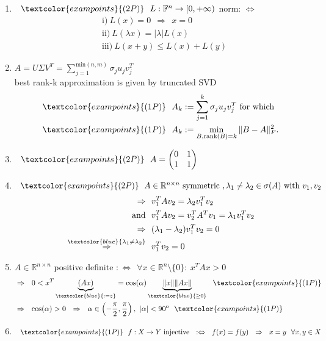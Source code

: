 {\color{solution}
\begin{enumerate}
	\item $~~\textcolor{exampoints}{(2P)}~~L:\mathbb{F}^n\rightarrow[0,+\infty)$ norm: $\Leftrightarrow$
	\begin{align*}
	&\text{i)}~L(x)=0~~\Rightarrow~~x=0\\
	&\text{ii)}~L(\lambda x)=|\lambda|L(x)\\
	&\text{iii)}~L(x+y)\leq L(x)+L(y)
	\end{align*}
	\item 
	$A=U\Sigma V^T=\sum_{j=1}^{\text{min}(n,m)}\sigma_ju_jv_j^T$\\
	best rank-k approximation is given by truncated SVD
	\begin{align*}
	&\textcolor{exampoints}{(1P)}~~A_k:=\sum_{j=1}^{k}\sigma_ju_jv_j^T~\text{for which}\\
	&\textcolor{exampoints}{(1P)}~~A_k:=\min_{B,\text{rank}(B)=k}\|B-A\|_F^2.
	\end{align*}
	\item $~~\textcolor{exampoints}{(2P)}~~A=\begin{pmatrix}0&1\\1&1\end{pmatrix}$
	\item $~~\textcolor{exampoints}{(2P)}~~A\in\mathbb{R}^{n\times n}~\text{symmetric}~, \lambda_1\neq\lambda_2\in\sigma(A)~\text{with}~v_1, v_2$
	\begin{align*}
	\Rightarrow~~&v_1^TAv_2=\lambda_2v_1^Tv_2\\
	\text{and}~~&v_1^TAv_2=v_2^TA^Tv_1=\lambda_1v_1^Tv_2\\
	\Rightarrow~~&(\lambda_1-\lambda_2)v_1^Tv_2=0\\
	\stackrel{\textcolor{blue}{\lambda_1\neq\lambda_2}}{\Rightarrow}~~&v_1^Tv_2=0
	\end{align*}
	\item 
	$A\in\mathbb{R}^{n\times n}$ positive definite $:\Leftrightarrow~~\forall x\in\mathbb{R}^n\setminus\{0\}:~x^TAx>0$
	\begin{align*}
	&\Rightarrow~~0<x^T\underbrace{(Ax)}_{\textcolor{blue}{:=z}}=\text{cos}(\alpha)\underbrace{\|x\|\|Ax\|}_{\textcolor{blue}{\geq 0}}~~\textcolor{exampoints}{(1P)}\\
	&\Rightarrow~~\text{cos}(\alpha)>0~~\Rightarrow~~\alpha\in\left(-\frac{\pi}{2},\frac{\pi}{2}\right),~|\alpha|<90^{\text{o}}~~\textcolor{exampoints}{(1P)}
	\end{align*}
	\item $~~\textcolor{exampoints}{(1P)}~~f:X\rightarrow Y~\text{injective}~~:\Leftrightarrow~~f(x)=f(y)~~\Rightarrow~~x=y~~\forall x,y\in X$

\end{enumerate}}
